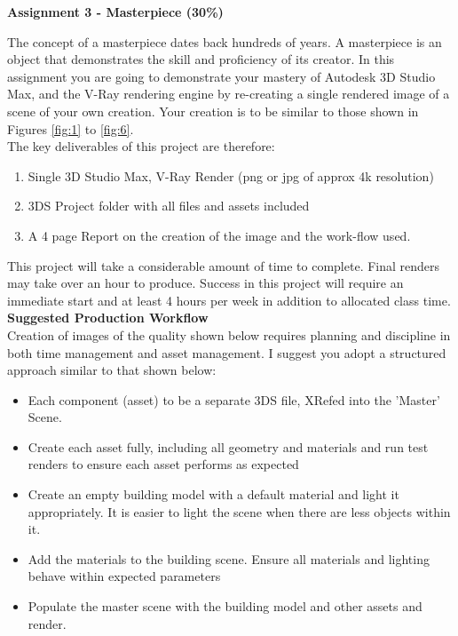 
	
\begin{flushleft}
\Large\textbf{Assignment 3 - Masterpiece (30\%)}\\
\end{flushleft}

The concept of a masterpiece dates back hundreds of years.  A masterpiece is an object that demonstrates the skill and proficiency of its creator.  In this assignment you are going to demonstrate your mastery of Autodesk 3D Studio Max, and the V-Ray rendering engine by re-creating a single rendered image of a scene of your own creation.  Your creation is to be similar to those shown in Figures \ref{fig:1} to \ref{fig:6}.\\

The key deliverables of this project are therefore:

\begin{enumerate}
	\item Single 3D Studio Max, V-Ray Render (png or jpg of approx 4k resolution)
	\item 3DS Project folder with all files and assets included
	\item A 4 page Report on the creation of the image and the work-flow used.
\end{enumerate}

This project will take a considerable amount of time to complete.  Final renders may take over an hour to produce.  Success in this project will require an immediate start and at least 4 hours per week in addition to allocated class time.  \\

\textbf{Suggested Production Workflow}\\
Creation of images of the quality shown below requires planning and discipline in both time management and asset management.  I suggest you adopt a structured approach similar to that shown below:

\begin{itemize}
	\item Each component (asset) to be a separate 3DS file, XRefed into the 'Master' Scene.
	\item Create each asset fully, including all geometry and materials and run test renders to ensure each asset performs as expected
	\item Create an empty building model with a default material and light it  appropriately.  It is easier to light the scene when there are less objects within it.  
	\item Add the materials to the building scene.  Ensure all materials and lighting behave within expected parameters
	\item Populate the master scene with the building model and other assets and render.
\end{itemize}

